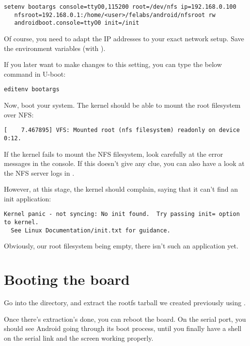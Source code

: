 \begin{verbatim}
setenv bootargs console=ttyO0,115200 root=/dev/nfs ip=192.168.0.100
   nfsroot=192.168.0.1:/home/<user>/felabs/android/nfsroot rw
   androidboot.console=ttyO0 init=/init
\end{verbatim}

Of course, you need to adapt the IP addresses to your exact network
setup. Save the environment variables (with ).

If you later want to make changes to this setting, you can type the
below command in U-boot:

\begin{verbatim}
editenv bootargs
\end{verbatim}

Now, boot your system. The kernel should be able to mount the root
filesystem over NFS:

\begin{verbatim}
[    7.467895] VFS: Mounted root (nfs filesystem) readonly on device 0:12.
\end{verbatim}

If the kernel fails to mount the NFS filesystem, look carefully at the
error messages in the console. If this doesn't give any clue, you can
also have a look at the NFS server logs in .

However, at this stage, the kernel should complain, saying that it
can't find an init application:

\footnotesize
\begin{verbatim}
Kernel panic - not syncing: No init found.  Try passing init= option to kernel.
  See Linux Documentation/init.txt for guidance.
\end{verbatim}
\normalsize

Obviously, our root filesystem being empty, there isn't such an
application yet.

\section{Booting the board}

Go into the  directory, and extract the rootfs tarball
we created previously using
.

Once there's extraction's done, you can reboot the board. On the
serial port, you should see Android going through its boot process,
until you finally have a shell on the serial link and the screen
working properly.
